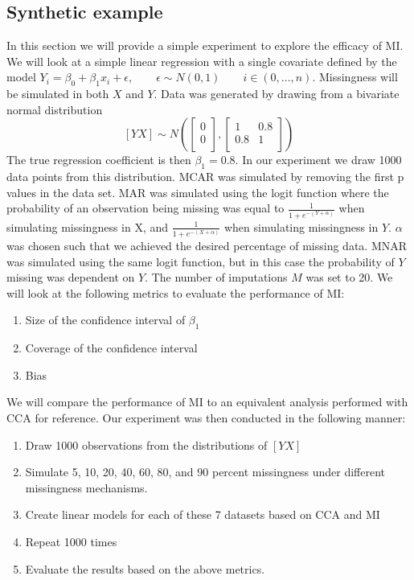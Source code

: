 \documentclass{article}
\begin{document}
	\subsection{Synthetic example}
	
	In this section we will provide a simple experiment to explore the efficacy of MI. We will look at a simple linear regression with a single covariate defined by the model $Y_{i} = \beta_{0} + \beta_{1}x_{i} + \epsilon, \qquad \epsilon \sim N(0,1) \qquad i\in(0,...,n)$. Missingness will be simulated in both $X$ and $Y$. Data was generated by drawing from a bivariate normal distribution $$[Y X] \sim N(\begin{bmatrix}
	0 \\
	0 \\
	\end{bmatrix},\begin{bmatrix}
	1 & 0.8 \\
	0.8 & 1 \\
	\end{bmatrix})$$ The true regression coefficient is then $\beta_{1} = 0.8$. In our experiment we draw 1000 data points from this distribution. MCAR was simulated by removing the first p values in the data set. MAR was simulated using the logit function where the probability of an observation being missing was equal to $\frac{1}{1+e^{-(Y + \alpha)}}$ when simulating missingness in X, and $\frac{1}{1+e^{-(X + \alpha)}}$ when simulating missingness in $Y$. $\alpha$ was chosen such that we achieved the desired percentage of missing data. MNAR was simulated using the same logit function, but in this case the probability of $Y$ missing was dependent on $Y$. The number of imputations $M$ was set to 20. We will look at the following metrics to evaluate the performance of MI:
	
	\begin{enumerate}
		\item Size of the confidence interval of $\beta_{1}$
		\item Coverage of the confidence interval
		\item Bias
	\end{enumerate}
	
	We will compare the performance of MI to an equivalent analysis performed with CCA for reference. Our experiment was then conducted in the following manner:
	
	\begin{enumerate}
		\item Draw 1000 observations from the distributions of $[Y X]$
		\item Simulate 5, 10, 20, 40, 60, 80, and 90 percent missingness under different missingness mechanisms.
		\item Create linear models for each of these 7 datasets based on CCA and MI
		\item Repeat 1000 times
		\item Evaluate the results based on the above metrics.
	\end{enumerate}
\end{document}

